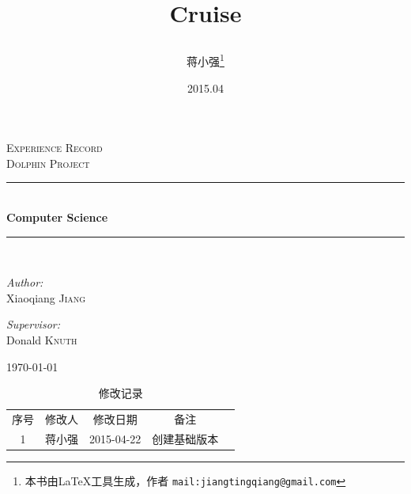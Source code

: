 \documentclass{book}
\begin{document}
\begin{titlepage}
\begin{center}

\textsc{\LARGE Experience Record}\\[1.5cm]

\textsc{Dolphin Project}\\[0.5cm]

\rule{8cm}{0.2em}\mbox{} \\[0.4cm]

{\huge \bfseries Computer Science}\\[0.4cm]

\rule{8cm}{0.2em}\mbox{} \\[1.5cm]

\begin{minipage}{0.4\textwidth}
\begin{flushleft} \large
\emph{Author:}\\
Xiaoqiang \textsc{Jiang}
\end{flushleft}
\end{minipage}

\begin{minipage}{0.4\textwidth}
\begin{flushright} \large
\emph{Supervisor:} \\
Donald \textsc{Knuth}
\end{flushright}
\end{minipage}

\vfill

{\large \today}

\end{center}
\end{titlepage}

\title{\Huge{Cruise}		
\author{蒋小强\footnote{本书由\LaTeX{}工具生成，作者
\texttt{mail:jiangtingqiang@gmail.com}
}}}

\date{2015.04}	

\maketitle %
\clearpage
\mbox{}         
\clearpage

\begin{table}\caption[Caption for LOF]{修改记录\protect\footnotemark}					
	\medskip
	\centering		
	\begin{tabular}{|c|c|c|c|c|}
		\hline
		\multirow{1}{*}{序号}
		& \multicolumn{1}{c|}{修改人}  
		& \multicolumn{1}{c|}{修改日期} 
		& \multicolumn{1}{c|}{备注}\\			
		\cline{1-4}
		1 & 蒋小强 & 2015-04-22 & 创建基础版本\\
		\hline	
	\end{tabular}
\end{table}
\end{document}
